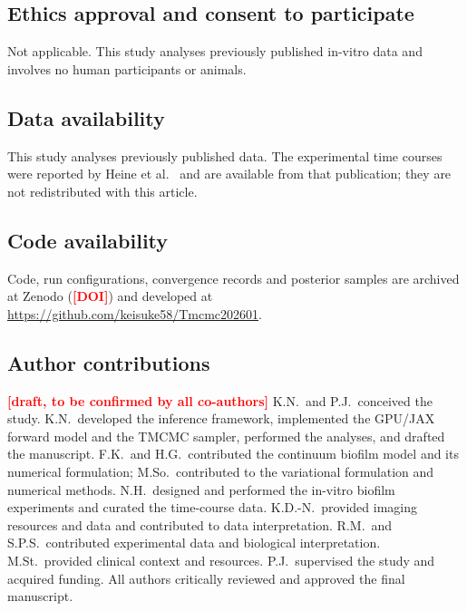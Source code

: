 \documentclass[11pt,a4paper]{article}
\newcommand{\TBD}[1]{\textcolor{red}{\textbf{[#1]}}}
\begin{document}
\subsection*{Ethics approval and consent to participate}
Not applicable. This study analyses previously published in-vitro data and involves no human participants or animals.

\subsection*{Data availability}
This study analyses previously published data. The experimental time courses were reported by Heine et al.~\cite{heine2025influence} and are available from that publication; they are not redistributed with this article.

\subsection*{Code availability}
Code, run configurations, convergence records and posterior samples are archived at Zenodo (\TBD{DOI}) and developed at \url{https://github.com/keisuke58/Tmcmc202601}.

\subsection*{Author contributions}
\TBD{draft, to be confirmed by all co-authors}
K.N.\ and P.J.\ conceived the study.
K.N.\ developed the inference framework, implemented the GPU/JAX forward model and the TMCMC sampler, performed the analyses, and drafted the manuscript.
F.K.\ and H.G.\ contributed the continuum biofilm model and its numerical formulation; M.So.\ contributed to the variational formulation and numerical methods.
N.H.\ designed and performed the in-vitro biofilm experiments and curated the time-course data.
K.D.-N.\ provided imaging resources and data and contributed to data interpretation.
R.M.\ and S.P.S.\ contributed experimental data and biological interpretation.
M.St.\ provided clinical context and resources.
P.J.\ supervised the study and acquired funding.
All authors critically reviewed and approved the final manuscript.




\end{document}

